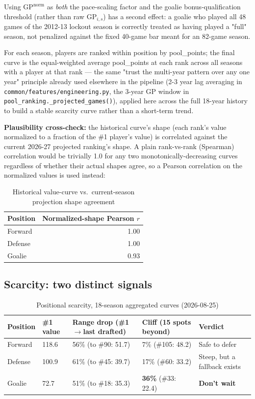 \documentclass[11pt, a4paper]{article}
\begin{document}
Using $\text{GP}^{\text{norm}}$ as \emph{both} the pace-scaling factor and the goalie
bonus-qualification threshold (rather than raw $\text{GP}_{i,s}$) has a second effect: a goalie
who played all 48 games of the 2012-13 lockout season is correctly treated as having played a
"full" season, not penalized against the fixed 40-game bar meant for an 82-game season.

For each season, players are ranked within position by pool\_points; the final curve is the
equal-weighted average pool\_points at each rank across all seasons with a player at that rank —
the same "trust the multi-year pattern over any one year" principle already used elsewhere in
the pipeline (2-3 year lag averaging in \texttt{common/features/engineering.py}, the 3-year GP
window in \texttt{pool\_ranking.\_projected\_games()}), applied here across the full 18-year
history to build a stable scarcity curve rather than a short-term trend.

\textbf{Plausibility cross-check:} the historical curve's shape (each rank's value normalized to
a fraction of the \#1 player's value) is correlated against the current 2026-27 projected
ranking's shape. A plain rank-vs-rank (Spearman) correlation would be trivially 1.0 for any two
monotonically-decreasing curves regardless of whether their actual shapes agree, so a Pearson
correlation on the normalized values is used instead:

\begin{table}[h]
\centering
\caption{Historical value-curve vs.\ current-season projection shape agreement}
\label{tab:crosscheck}
\begin{tabular}{lr}
\toprule
Position & Normalized-shape Pearson $r$ \\
\midrule
Forward & 1.00 \\
Defense & 1.00 \\
Goalie  & 0.93 \\
\bottomrule
\end{tabular}
\end{table}

\subsection{Scarcity: two distinct signals}

\begin{table}[h]
\centering
\caption{Positional scarcity, 18-season aggregated curves (2026-08-25)}
\label{tab:scarcity}
\begin{tabular}{l C{1.4cm} L{4.3cm} L{3.6cm} L{3.2cm}}
\toprule
Position & \#1 value & Range drop (\#1$\to$last drafted) & Cliff (15 spots beyond) & Verdict \\
\midrule
Forward & 118.6 & 56\% (to \#90: 51.7) & 7\% (\#105: 48.2) & Safe to defer \\
Defense & 100.9 & 61\% (to \#45: 39.7) & 17\% (\#60: 33.2) & Steep, but a fallback exists \\
Goalie  & 72.7  & 51\% (to \#18: 35.3) & \textbf{36\%} (\#33: 22.4) & \textbf{Don't wait} \\
\bottomrule
\end{tabular}
\end{table}
\end{document}
